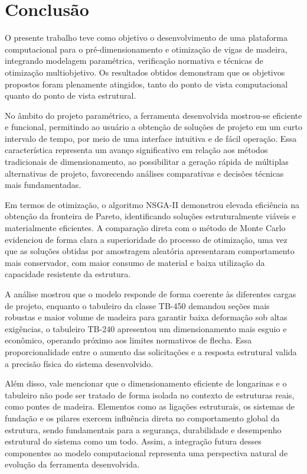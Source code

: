\chapter{Conclusão}

O presente trabalho teve como objetivo o desenvolvimento de uma plataforma computacional para o pré-dimensionamento e otimização de vigas de madeira, integrando modelagem paramétrica, verificação normativa e técnicas de otimização multiobjetivo. Os resultados obtidos demonstram que os objetivos propostos foram plenamente atingidos, tanto do ponto de vista computacional quanto do ponto de vista estrutural.

No âmbito do projeto paramétrico, a ferramenta desenvolvida mostrou-se eficiente e funcional, permitindo ao usuário a obtenção de soluções de projeto em um curto intervalo de tempo, por meio de uma interface intuitiva e de fácil operação. Essa característica representa um avanço significativo em relação aos métodos tradicionais de dimensionamento, ao possibilitar a geração rápida de múltiplas alternativas de projeto, favorecendo análises comparativas e decisões técnicas mais fundamentadas.

Em termos de otimização, o algoritmo NSGA-II demonstrou elevada eficiência na obtenção da fronteira de Pareto, identificando soluções estruturalmente viáveis e materialmente eficientes. A comparação direta com o método de Monte Carlo evidenciou de forma clara a superioridade do processo de otimização, uma vez que as soluções obtidas por amostragem aleatória apresentaram comportamento mais conservador, com maior consumo de material e baixa utilização da capacidade resistente da estrutura.

A análise mostrou que o modelo responde de forma coerente às diferentes cargas de projeto, enquanto o tabuleiro da classe TB-450 demandou seções mais robustas e maior volume de madeira para garantir baixa deformação sob altas exigências, o tabuleiro TB-240 apresentou um dimensionamento mais esguio e econômico, operando próximo aos limites normativos de flecha. Essa proporcionalidade entre o aumento das solicitações e a resposta estrutural valida a precisão física do sistema desenvolvido.

Além disso, vale mencionar que o dimensionamento eficiente de longarinas e o tabuleiro não pode ser tratado de forma isolada no contexto de estruturas reais, como pontes de madeira. Elementos como as ligações estruturais, os sistemas de fundação e os pilares exercem influência direta no comportamento global da estrutura, sendo fundamentais para a segurança, durabilidade e desempenho estrutural do sistema como um todo. Assim, a integração futura desses componentes ao modelo computacional representa uma perspectiva natural de evolução da ferramenta desenvolvida.

